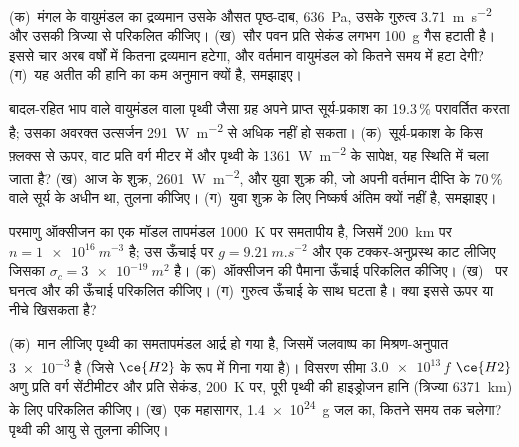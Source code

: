 \begin{exercise}[$\star\star$]\label{exo:b3:planetary-atmospheres:8}
(क)~मंगल के वायुमंडल का द्रव्यमान उसके औसत पृष्ठ-दाब,
\qty{636}{Pa}, उसके गुरुत्व \qty{3.71}{m.s^{-2}} और उसकी
त्रिज्या से परिकलित कीजिए। (ख)~सौर पवन प्रति सेकंड लगभग \qty{100}{g} गैस हटाती है।
इससे चार अरब वर्षों में कितना द्रव्यमान हटेगा, और वर्तमान वायुमंडल को
कितने समय में हटा देगी? (ग)~यह अतीत की हानि का कम अनुमान क्यों है,
समझाइए।
\end{exercise}

\begin{exercise}[$\star\star$]\label{exo:b3:planetary-atmospheres:9}
बादल-रहित भाप वाले वायुमंडल वाला पृथ्वी जैसा ग्रह अपने प्राप्त सूर्य-प्रकाश का 19.3\,\%
परावर्तित करता है; उसका अवरक्त उत्सर्जन \qty{291}{W.m^{-2}} से अधिक नहीं हो सकता।
(क)~सूर्य-प्रकाश के किस फ़्लक्स से ऊपर, वाट प्रति वर्ग
मीटर में और पृथ्वी के \qty{1361}{W.m^{-2}} के सापेक्ष, यह  स्थिति में चला जाता है?
(ख)~आज के शुक्र, \qty{2601}{W.m^{-2}}, और युवा शुक्र की, जो
अपनी वर्तमान दीप्ति के 70\,\% वाले सूर्य के अधीन था, तुलना कीजिए। (ग)~युवा शुक्र के लिए निष्कर्ष
अंतिम क्यों नहीं है, समझाइए।
\end{exercise}

\begin{exercise}[$\star\star\star$]\label{exo:b3:planetary-atmospheres:10}
परमाणु ऑक्सीजन का एक मॉडल तापमंडल \qty{1000}{K} पर समतापीय है, जिसमें
\qty{200}{km} पर $n = \qty{1e16}{m^{-3}}$ है; उस ऊँचाई पर $g =
\qty{9.21}{m.s^{-2}}$ और एक टक्कर-अनुप्रस्थ काट लीजिए जिसका
$\sigma_c = \qty{3e-19}{m^2}$ है। (क)~ऑक्सीजन की पैमाना ऊँचाई परिकलित कीजिए।
(ख)~ पर घनत्व और  की ऊँचाई परिकलित कीजिए।
(ग)~गुरुत्व ऊँचाई के साथ घटता है। क्या इससे  ऊपर
या नीचे खिसकता है?
\end{exercise}

\begin{exercise}[$\star\star\star$]\label{exo:b3:planetary-atmospheres:11}
(क)~मान लीजिए पृथ्वी का समतापमंडल आर्द्र हो गया है, जिसमें जलवाष्प का मिश्रण-अनुपात
\num{3e-3} है (जिसे $\ce{H2}$ के रूप में गिना गया है)। विसरण
सीमा $\num{3.0e13}\,f$ $\ce{H2}$ अणु प्रति वर्ग सेंटीमीटर और
प्रति सेकंड, \qty{200}{K} पर, पूरी पृथ्वी की हाइड्रोजन हानि
(त्रिज्या \qty{6371}{km}) के लिए परिकलित कीजिए। (ख)~एक महासागर,
\qty{1.4e24}{g} जल का, कितने समय तक चलेगा? पृथ्वी की आयु से तुलना कीजिए।
\end{exercise}

